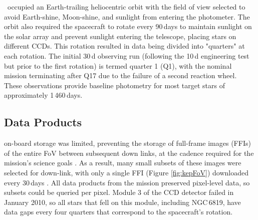 \Kepler~occupied an Earth-trailing heliocentric orbit with the field of view selected to avoid Earth-shine, Moon-shine, and sunlight from entering the photometer. %
The orbit also required the spacecraft to rotate every 90\,days to maintain sunlight on the solar array and prevent sunlight entering the telescope, placing stars on different CCDs. This rotation resulted in data being divided into "quarters" at each rotation. The initial 30\,d observing run (following the 10\,d engineering test but prior to the first rotation) is termed quarter 1 (Q1), with the nominal mission terminating after Q17 due to the failure of a second reaction wheel. These observations provide baseline photometry for most target stars of approximately 1\,460\,days.

\subsection{Data Products}
\label{chap:intro:data}

\Keplers on-board storage was limited, preventing the storage of full-frame images (FFIs) of the entire FoV between subsequent down links, at the cadence required for the mission's science goals \citep{bryson_Selecting_2010}. As a result, many small subsets of these images were selected for down-link, with only a single FFI (Figure \ref{fig:kepFoV}) downloaded every 30\,days \citep{thompson_kepler_2016}. All data products from the mission preserved pixel-level data, so subsets could be queried per pixel. Module 3 of the CCD detector failed in January 2010, so all stars that fell on this module, including NGC\,6819, have data gaps every four quarters that correspond to the spacecraft's rotation.

